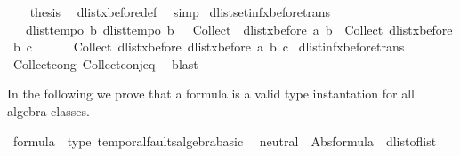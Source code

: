 \begin{isabellebody}
\ \ \isamarkupfalse%
\ {\isacharquery}thesis\ \isamarkupfalse%
\ dlist{\isacharunderscore}xbefore{\isacharunderscore}def\ \isamarkupfalse%
\ simp\isanewline
{}\isamarkupfalse%
%
\endisatagproof
{\isafoldproof}%
%
\isadelimproof
\isanewline
%
\endisadelimproof
\isanewline
{}\isamarkupfalse%
\ dlistset{\isacharunderscore}inf{\isacharunderscore}xbefore{\isacharunderscore}trans{\isacharcolon}\isanewline
\ \ {\isachardoublequoteopen}{\isasymlbrakk}\ dlist{\isacharunderscore}tempo{}\ b{\isacharsemicolon}\ dlist{\isacharunderscore}tempo{}\ b\ {\isasymrbrakk}\ {\isasymLongrightarrow}\ {\isacharparenleft}Collect\ \ {\isacharparenleft}dlist{\isacharunderscore}xbefore\ a\ b{\isacharparenright}\ {\isasyminter}\ Collect\ {\isacharparenleft}dlist{\isacharunderscore}xbefore\ b\ c{\isacharparenright}{\isacharparenright}\ {\isacharequal}\ \isanewline
\ \ \ \ Collect\ {\isacharparenleft}dlist{\isacharunderscore}xbefore\ {\isacharparenleft}dlist{\isacharunderscore}xbefore\ a\ b{\isacharparenright}\ c{\isacharparenright}{\isachardoublequoteclose}\isanewline
%
\isadelimproof
%
\endisadelimproof
%
\isatagproof
{}\isamarkupfalse%
\ dlist{\isacharunderscore}inf{\isacharunderscore}xbefore{\isacharunderscore}trans\isanewline
{}\isamarkupfalse%
\ Collect{\isacharunderscore}cong\ Collect{\isacharunderscore}conj{\isacharunderscore}eq\ \isamarkupfalse%
\ blast%
\endisatagproof
{\isafoldproof}%
%
\isadelimproof
%
\endisadelimproof
%
\isamarkuptrue%
%
\begin{isamarkuptext}%
In the following we prove that a formula is a valid type instantation for all \ac{algebra} classes.%
\end{isamarkuptext}\isamarkuptrue%
%
\isamarkuptrue%
\isamarkupfalse%
\ formula\ {\isacharcolon}{\isacharcolon}\ {\isacharparenleft}type{\isacharparenright}\ temporal{\isacharunderscore}faults{\isacharunderscore}algebra{\isacharunderscore}basic\isanewline
{}\isanewline
\isanewline
{}\isamarkupfalse%
\isanewline
\ \ {\isachardoublequoteopen}neutral\ {\isacharequal}\ Abs{\isacharunderscore}formula\ {\isacharbraceleft}\ dlist{\isacharunderscore}of{\isacharunderscore}list\ {\isacharbrackleft}{\isacharbrackright}\ {\isacharbraceright}{\isachardoublequoteclose}\isanewline
\isanewline
{}\isamarkupfalse%

\end{isabellebody}
